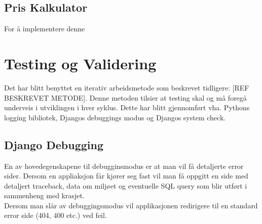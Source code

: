\subsection*{Pris Kalkulator}
For å implementere denne 



\clearpage


\clearpage
\section{Testing og Validering}
Det har blitt benyttet en iterativ arbeidsmetode som beskrevet tidligere: [REF BESKREVET METODE]. Denne metoden tilsier at testing skal og må foregå underveis i utviklingen i hver syklus. Dette har blitt gjennomført vha. Pythons logging bibliotek, Djangos debuggings modus og Djangos system check. 

\subsection{Django Debugging}
En av hovedegenskapene til debugginsmodus er at man vil få detaljerte error sider.  Dersom en appliaksjon får kjører seg fast vil man få oppgitt en side med detaljert traceback, data om miljøet og eventuelle SQL query som blir utført i sammenheng med krasjet. \\
Dersom man slår av debuggingsmodus vil applikasjonen redirigere til en standard error side (404, 400 etc.) ved feil.


